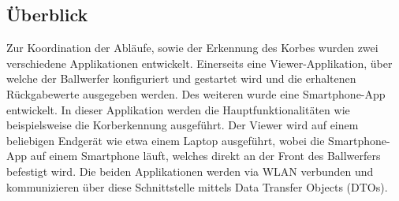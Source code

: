 \subsection{Überblick}
Zur Koordination der Abläufe, sowie der Erkennung des Korbes wurden zwei verschiedene Applikationen entwickelt. Einerseits eine Viewer-Applikation, über welche der Ballwerfer konfiguriert und gestartet wird und die erhaltenen Rückgabewerte ausgegeben werden. Des weiteren wurde eine Smartphone-App entwickelt. In dieser Applikation werden die Hauptfunktionalitäten wie beispielsweise die Korberkennung ausgeführt. Der Viewer wird auf einem beliebigen Endgerät wie etwa einem Laptop ausgeführt, wobei die Smartphone-App auf einem Smartphone läuft, welches direkt an der Front des Ballwerfers befestigt wird. Die beiden Applikationen werden via WLAN verbunden und kommunizieren über diese Schnittstelle mittels Data Transfer Objects (DTOs).
